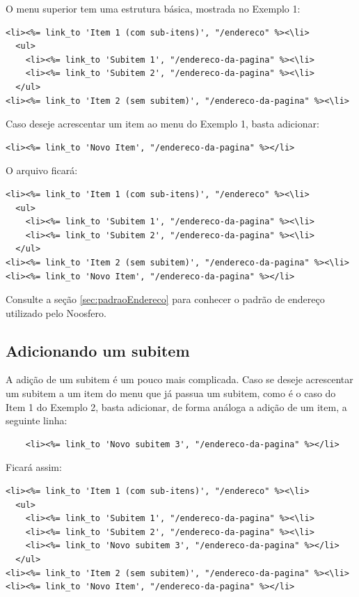O menu superior tem uma estrutura básica, mostrada no Exemplo 1:

\begin{verbatim}
<li><%= link_to 'Item 1 (com sub-itens)', "/endereco" %><\li>
  <ul>
    <li><%= link_to 'Subitem 1', "/endereco-da-pagina" %><\li>
    <li><%= link_to 'Subitem 2', "/endereco-da-pagina" %><\li>
  </ul>
<li><%= link_to 'Item 2 (sem subitem)', "/endereco-da-pagina" %><\li>
\end{verbatim}

Caso deseje acrescentar um item ao menu do Exemplo 1, basta adicionar:

\begin{verbatim}
<li><%= link_to 'Novo Item', "/endereco-da-pagina" %></li>
\end{verbatim}

O arquivo ficará:

\begin{verbatim}
<li><%= link_to 'Item 1 (com sub-itens)', "/endereco" %><\li>
  <ul>
    <li><%= link_to 'Subitem 1', "/endereco-da-pagina" %><\li>
    <li><%= link_to 'Subitem 2', "/endereco-da-pagina" %><\li>
  </ul>
<li><%= link_to 'Item 2 (sem subitem)', "/endereco-da-pagina" %><\li>
<li><%= link_to 'Novo Item', "/endereco-da-pagina" %></li>
\end{verbatim}

Consulte a seção \ref{sec:padraoEndereco} para conhecer o padrão de endereço utilizado pelo Noosfero.

\subsection{Adicionando um subitem}

A adição de um subitem é um pouco mais complicada. Caso se deseje acrescentar um subitem a um item do menu que já passua um subitem, como é o caso do Item 1 do Exemplo 2, basta adicionar, de forma análoga a adição de um item, a seguinte linha:

\begin{verbatim}
    <li><%= link_to 'Novo subitem 3', "/endereco-da-pagina" %></li>
\end{verbatim}

\newpage
Ficará assim:

\begin{verbatim}
<li><%= link_to 'Item 1 (com sub-itens)', "/endereco" %><\li>
  <ul>
    <li><%= link_to 'Subitem 1', "/endereco-da-pagina" %><\li>
    <li><%= link_to 'Subitem 2', "/endereco-da-pagina" %><\li>
    <li><%= link_to 'Novo subitem 3', "/endereco-da-pagina" %></li>
  </ul>
<li><%= link_to 'Item 2 (sem subitem)', "/endereco-da-pagina" %><\li>
<li><%= link_to 'Novo Item', "/endereco-da-pagina" %></li>
\end{verbatim}

